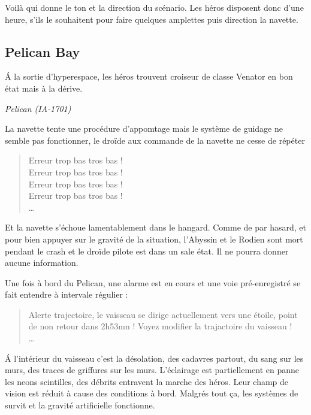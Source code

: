 \documentclass{jdrp}
\begin{document}
Voilà qui donne le ton et la direction du scénario. Les héros disposent donc d'une heure, s'ils le souhaitent pour faire quelques amplettes puis direction la navette.

\subsection{Pelican Bay}
\begin{flushright} 
	\begin{minipage}[r]{0.7\linewidth}
		\hspace{-2\baselineskip}\'A la sortie d'hyperespace, les héros trouvent croiseur de classe Venator en bon état mais à la dérive.
	\end{minipage}
\end{flushright} 

\begin{flushright}
	\emph{Pelican (IA-1701)}
\end{flushright}

\vspace{5\baselineskip}
La navette tente une procédure d'appomtage mais le système de guidage ne semble pas fonctionner, le droïde aux commande de la navette ne cesse de répéter 

\begin{quote}
	Erreur trop bas tros bas !\\
	Erreur trop bas tros bas !\\
	Erreur trop bas tros bas !\\
	Erreur trop bas tros bas !\\
	\ldots
\end{quote}

Et la navette s'échoue lamentablement dans le hangard. Comme de par hasard, et pour bien appuyer sur le gravité de la situation, l'Abyssin et le Rodien sont mort pendant le crash et le droïde pilote est dans un sale état. Il ne pourra donner aucune information.

Une fois à bord du Pelican, une alarme est en cours et une voie pré-enregistré se fait entendre à intervale régulier :

\begin{quote}
	Alerte trajectoire, le vaisseau se dirige actuellement vers une étoile, point de non retour dans 2h53mn ! 
	Voyez modifier la trajactoire du vaisseau !\\ 
	\ldots
\end{quote}

\'A l'intérieur du vaisseau c'est la désolation, des cadavres partout, du sang sur les murs, des traces de griffures sur les murs. L'éclairage est partiellement en panne les neons scintilles, des débrits entravent la marche des héros. Leur champ de vision est réduit à cause des conditions à bord. Malgrés tout ça, les systèmes de survit et la gravité artificielle fonctionne.\\
\end{document}

